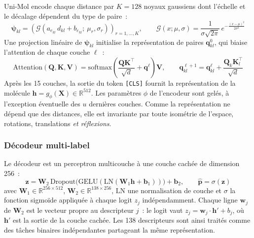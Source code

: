 Uni-Mol encode chaque distance par $K = 128$ noyaux gaussiens dont l'échelle et le décalage dépendent du type de paire~:
\begin{equation}
   \label{eq:Gaussiennes}
   \boldsymbol{\psi}_{kl} = \left( \mathcal{G}\left(a_{e_{kl}} \, d_{kl} + b_{e_{kl}} ;\ \mu_r, \sigma_r\right) \right)_{r = 1, \ldots, K},
   \qquad
   \mathcal{G}(x ; \mu, \sigma) = \frac{1}{\sigma \sqrt{2 \pi}} \, e^{-\frac{(x - \mu)^2}{2 \sigma^2}}
\end{equation}
Une projection linéaire de $\boldsymbol{\psi}_{kl}$ initialise la représentation de paires $\mathbf{q}^{0}_{kl}$, qui biaise l'attention de chaque couche $\ell$~:
\begin{equation}
   \label{eq:Attention}
   \mathrm{Attention}(\mathbf{Q}, \mathbf{K}, \mathbf{V}) = \mathrm{softmax}\left( \frac{\mathbf{Q} \mathbf{K}^{\top}}{\sqrt{d}} + \mathbf{q}^{\ell} \right) \mathbf{V},
   \qquad
   \mathbf{q}^{\ell + 1}_{kl} = \mathbf{q}^{\ell}_{kl} + \frac{\mathbf{Q}_k \mathbf{K}_l^{\top}}{\sqrt{d}}
\end{equation}
Après les 15 couches, la sortie du token \texttt{[CLS]} fournit la représentation de la molécule $\mathbf{h} = g_\phi(\mathbf{X}) \in \mathbb{R}^{512}$.
Les paramètres $\phi$ de l'encodeur sont gelés, à l'exception éventuelle des $u$ dernières couches.
Comme la représentation ne dépend que des distances, elle est invariante par toute isométrie de l'espace, rotations, translations \emph{et réflexions}.

\subsubsection{Décodeur multi-label}

Le décodeur est un perceptron multicouche à une couche cachée de dimension 256~:
\begin{equation}
   \label{eq:Decodeur}
   \mathbf{z} = \mathbf{W}_2 \, \mathrm{Dropout}\big(\mathrm{GELU}(\mathrm{LN}(\mathbf{W}_1 \mathbf{h} + \mathbf{b}_1))\big) + \mathbf{b}_2,
   \qquad
   \hat{\mathbf{p}} = \sigma(\mathbf{z})
\end{equation}
avec $\mathbf{W}_1 \in \mathbb{R}^{256 \times 512}$, $\mathbf{W}_2 \in \mathbb{R}^{138 \times 256}$, $\mathrm{LN}$ une normalisation de couche et $\sigma$ la fonction sigmoïde appliquée à chaque logit $z_j$ indépendamment.
Chaque ligne $\mathbf{w}_j$ de $\mathbf{W}_2$ est le vecteur propre au descripteur $j$~: le logit vaut $z_j = \mathbf{w}_j \cdot \mathbf{h}' + b_j$, où $\mathbf{h}'$ est la sortie de la couche cachée.
Les 138 descripteurs sont ainsi traités comme des tâches binaires indépendantes partageant la même représentation.

